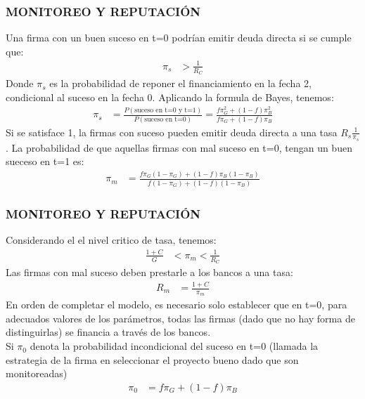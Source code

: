 \begin{frame}
    \frametitle{{\normalsize MONITOREO Y REPUTACIÓN} {}}

 Una firma con un buen suceso en t=0 podrían emitir deuda directa si se cumple que:
 \begin{align}
 \pi_{s}&>\frac{1}{R_{C}}
 \end{align}
 Donde $\pi_{s} $ es la probabilidad de reponer el financiamiento en la fecha 2, condicional al suceso en la fecha 0. Aplicando la formula de Bayes, tenemos:
 \begin{align}
 \pi_{s}&=\frac{P(\mbox{suceso en t=0 y t=1})}{P(\mbox{suceso en t=0})}=\frac{f\pi_{G}^{2}+(1-f)\pi_{B}^{2}}{f\pi_{G}+(1-f)\pi_{B}}
 \end{align}
 Si se satisface 1, la firmas con suceso pueden emitir deuda directa
  a una tasa $R_{s}\frac{1}{\pi_{s}} $. La probabilidad de que aquellas firmas con mal suceso en t=0, tengan un buen sueceso en t=1 es:
 \begin{align}
 \pi_{m}&=\frac{f\pi_{G}(1-\pi_{G})+(1-f)\pi_{B}(1-\pi_{B})}{f(1-\pi_{G})+(1-f)(1-\pi_{B})}
 \end{align}
  
 \end{frame}

\begin{frame}
    \frametitle{{\normalsize MONITOREO Y REPUTACIÓN} {}}
Considerando el el nivel critico de tasa, tenemos:
  \begin{align}
  \frac{1+C}{G}&<\pi_{m}<\frac{1}{R_{C}}
  \end{align} 
Las firmas con mal suceso deben prestarle a los bancos a una tasa:
 \begin{align}
 R_{m}&=\frac{1+C}{\pi_{m}}
 \end{align}   
En orden de completar el modelo, es necesario solo establecer que en t=0, para adecuados valores de los parámetros, todas las firmas (dado que no hay forma de distinguirlas) se financia a través de los bancos.\\
Si $\pi_{0}$ denota la probabilidad incondicional del suceso en t=0 (llamada la estrategia de la firma en seleccionar el proyecto bueno dado que son monitoreadas)
\begin{align}
\pi_{0}&=f\pi_{G}+(1-f)\pi_{B}
\end{align}   

\end{frame}

